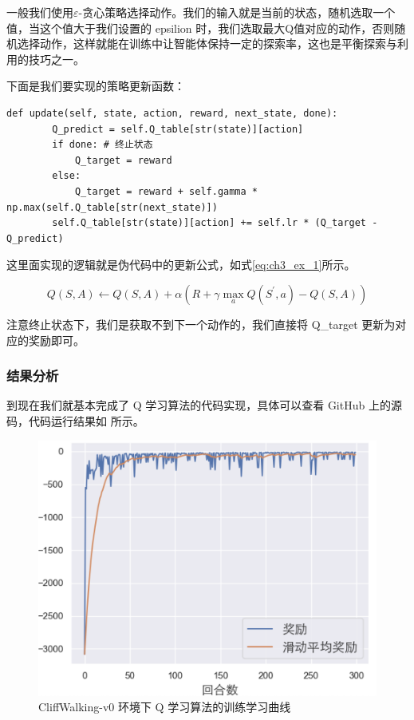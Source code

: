 一般我们使用$\varepsilon$-贪心策略选择动作。我们的输入就是当前的状态，随机选取一个值，当这个值大于我们设置的 epsilion 时，我们选取最大Q值对应的动作，否则随机选择动作，这样就能在训练中让智能体保持一定的探索率，这也是平衡探索与利用的技巧之一。

下面是我们要实现的策略更新函数：

\begin{lstlisting}[style=Python]
    def update(self, state, action, reward, next_state, done):
        Q_predict = self.Q_table[str(state)][action] 
        if done: # 终止状态
            Q_target = reward  
        else:
            Q_target = reward + self.gamma * np.max(self.Q_table[str(next_state)]) 
        self.Q_table[str(state)][action] += self.lr * (Q_target - Q_predict)
\end{lstlisting}

这里面实现的逻辑就是伪代码中的更新公式，如式\eqref{eq:ch3_ex_1}所示。

\begin{equation}
	Q(S, A) \leftarrow Q(S, A)+\alpha\left(R+\gamma \max _{a} Q\left(S^{\prime}, a\right)-Q(S, A)\right)
	\label{eq:ch3_ex_1}
\end{equation}

注意终止状态下，我们是获取不到下一个动作的，我们直接将 Q\_target 更新为对应的奖励即可。 

\subsubsection{结果分析}

到现在我们就基本完成了 Q 学习算法的代码实现，具体可以查看 GitHub 上的源码，代码运行结果如 所示。

\begin{figure}[htb]
    \centering
    \includegraphics[width=0.5\linewidth]{res/ch3/assets/train_rewards_curve_cn}
    \caption{CliffWalking-v0 环境下 Q 学习算法的训练学习曲线}
    \label{fig:train_rewards_curve_cn}
\end{figure}

